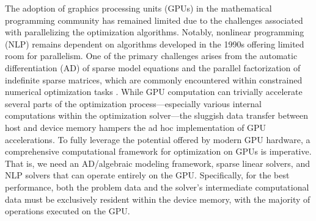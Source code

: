\documentclass{IEEEtran4PSCC} %
\begin{document}
The adoption of graphics processing units (GPUs) in the mathematical programming community has remained
limited due to the challenges associated with parallelizing the optimization algorithms. Notably, nonlinear programming (NLP) remains dependent on
algorithms developed in the 1990s offering limited room for parallelism.
One of the primary challenges arises from the
automatic differentiation (AD) of sparse model equations and the
parallel factorization of indefinite sparse matrices, which are
commonly encountered within constrained numerical optimization tasks
\cite{anitescu2021targeting}. While GPU computation can trivially
accelerate several parts of the optimization process---especially
various internal computations within the optimization solver---the
sluggish data transfer between host and device memory hampers the
ad hoc implementation of GPU accelerations. To
fully leverage the potential offered by modern GPU hardware, a comprehensive computational framework for
optimization on GPUs is imperative. That is, we need an AD/algebraic
modeling framework, sparse linear solvers, and NLP solvers that can
operate entirely on the GPU. Specifically, for the best performance,
both the problem data and the solver's intermediate computational data
must be exclusively resident within the device memory, with the
majority of operations executed on the GPU.







\end{document}
